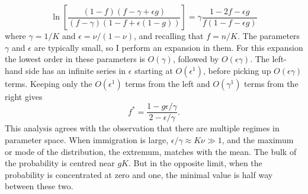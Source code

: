 \fi
\begin{equation}
\ln\left[ \frac{(1-f)(f-\gamma+\epsilon g)}{(f-\gamma)(1-f+\epsilon(1-g))}\right] = \gamma\frac{1-2f-\epsilon g}{f\left(1-f-\epsilon g\right)}
\end{equation}
where $\gamma = 1/K$ and $\epsilon = \nu/(1-\nu)$, and recalling that $f=n/K$. 
The parameters $\gamma$ and $\epsilon$ are typically small, so I perform an expansion in them. 
For this expansion the lowest order in these parameters is $O(\gamma)$, followed by $O(\epsilon\gamma)$. 
The left-hand side has an infinite series in $\epsilon$ starting at $O(\epsilon^1)$, before picking up $O(\epsilon\gamma)$ terms. 
Keeping only the $O(\epsilon^1)$ terms from the left and $O(\gamma^1)$ terms from the right gives
\begin{equation}
	f^* = \frac{1-g\epsilon/\gamma}{2-\epsilon/\gamma}. %
\end{equation}
This analysis agrees with the observation that there are multiple regimes in parameter space. 
When immigration is large, $\epsilon/\gamma \approx K\nu \gg 1$, and the maximum or mode of the distribution, the extremum, matches with the mean. 
The bulk of the probability is centred near $g K$. 
But in the opposite limit, when the probability is concentrated at zero and one, the minimal value is half way between these two. 

